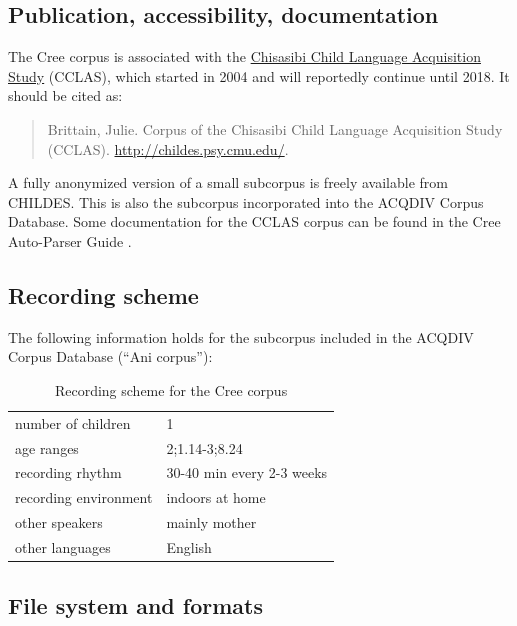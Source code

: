 \documentclass[a4paper, 11pt]{book}
\begin{document}
\subsection{Publication, accessibility, documentation}

The Cree corpus \citep{Brittain2015a} is associated with the \href{http://www.mun.ca/cclas/}{Chisasibi Child Language Acquisition Study} (CCLAS), which started in 2004 and will reportedly continue until 2018. It should be cited as: 

\begin{quote}
Brittain, Julie. Corpus of the Chisasibi Child Language Acquisition Study (CCLAS). \url{http://childes.psy.cmu.edu/}.
\end{quote}

A fully anonymized version of a small subcorpus is freely available from CHILDES. This is also the subcorpus incorporated into the ACQDIV Corpus Database. Some documentation for the CCLAS corpus can be found in the Cree Auto-Parser Guide \citep{Acton2013a}.

\subsection{Recording scheme}

The following information holds for the subcorpus included in the ACQDIV Corpus Database (“Ani corpus”): 

\begin{table}[ht]
	\centering
	\begin{tabular}{ll}
		\toprule
		number of children 	& 1 \\
		age ranges 			& 2;1.14-3;8.24 \\
		recording rhythm 	& 30-40 min every 2-3 weeks \\
		recording environment & indoors at home \\
		other speakers		& mainly mother \\
		other languages		& English \\
		\bottomrule
	\end{tabular}
	\caption{Recording scheme for the Cree corpus}
	\label{tab:Cree recording scheme}
\end{table}

\subsection{File system and formats}
\end{document}
